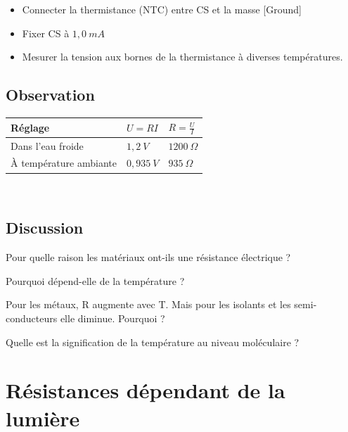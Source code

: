 \documentclass{book}
\begin{document}
\begin{itemize}
  \item Connecter la thermistance (NTC) entre CS et la masse [Ground]
  \item Fixer CS à $1,0\ mA$
  \item Mesurer la tension aux bornes de la thermistance à diverses températures.
\end{itemize}

\subsection{Observation}


\begin{tabular}{|l|l|l|}
\hline
\textbf{Réglage}&\textbf{$U=RI$}&\textbf{$R=\frac{U}{I}$}
\\ \hline
Dans l'eau froide&$1,2\ V$&$1200\ \Omega$
\\ \hline
À température ambiante&$0,935\ V$&$935\ \Omega$
\\ \hline
\end{tabular}\\[0.5em]

\subsection{Discussion}


Pour quelle raison les matériaux ont-ils une résistance électrique ?



Pourquoi dépend-elle de la température ?



Pour les métaux, R augmente avec T. Mais pour les isolants et les semi-conducteurs elle diminue. Pourquoi ?



Quelle est la signification de la température au niveau moléculaire ?










\section{Résistances dépendant de la lumière}
\end{document}
